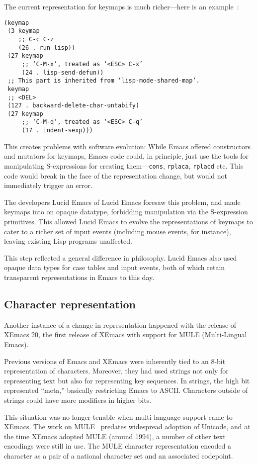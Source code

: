 \documentclass[format=acmsmall, review=false, screen=true]{acmart}
\begin{document}
The current representation for keymaps is much richer---here is an
example~\cite{ELispManual2018}:
%
\begin{verbatim}
(keymap
 (3 keymap
    ;; C-c C-z
    (26 . run-lisp))
 (27 keymap
     ;; ‘C-M-x’, treated as ‘<ESC> C-x’
     (24 . lisp-send-defun))
 ;; This part is inherited from ‘lisp-mode-shared-map’.
 keymap
 ;; <DEL>
 (127 . backward-delete-char-untabify)
 (27 keymap
     ;; ‘C-M-q’, treated as ‘<ESC> C-q’
     (17 . indent-sexp)))
\end{verbatim}
%
This creates problems with software evolution: While Emacs offered
constructors and mutators for keymaps, Emacs code could, in principle,
just use the tools for manipulating S-expressions for creating
them---\texttt{cons}, \texttt{rplaca}, \texttt{rplacd} etc.  This code
would break in the face of the representation change, but would not
immediately trigger an error.

The developers Lucid Emacs of Lucid Emacs foresaw this problem, and
made keymaps into on opaque datatype, forbidding manipulation via the
S-expression primitives.  This allowed Lucid Emacs to evolve the
representations of keymaps to cater to a richer set of input events
(including mouse events, for instance), leaving existing Lisp programs
unaffected.

This step reflected a general difference in philosophy.  Lucid Emacs
also used opaque data types for case tables and input events, both of
which retain transparent representations in Emacs to this day.

\subsection{Character representation}

Another instance of a change in representation happened with the
release of XEmacs 20, the first release of XEmacs with support for
MULE (Multi-Lingual Emacs).

Previous versions of Emacs and XEmacs were inherently tied to an 8-bit
representation of characters.  Moreover, they had used strings not
only for representing text but also for representing key sequences.
In strings, the high bit represented ``meta,'' basically restricting
Emacs to ASCII.  Characters outside of strings could have more
modifiers in higher bits.

This situation was no longer tenable when multi-language support came to
XEmacs.  The work on MULE~\cite{MULEFIXME} predates widespread
adoption of Unicode, and at the time XEmacs adopted MULE (around
1994), a number of other text encodings were still in use.  The MULE
character representation encoded a character as a pair of a national
character set and an associated codepoint.
\end{document}
